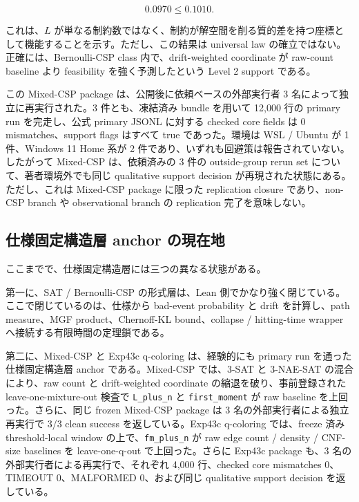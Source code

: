\documentclass[12pt,a4paper]{article}
\begin{document}
\[
0.0970 \le 0.1010.
\]

これは、\(L\) が単なる制約数ではなく、制約が解空間を削る質的差を持つ座標として機能することを示す。ただし、この結果は universal law の確立ではない。正確には、Bernoulli-CSP class 内で、drift-weighted coordinate が raw-count baseline より feasibility を強く予測したという Level 2 support である。

この Mixed-CSP package は、公開後に依頼ベースの外部実行者 3 名によって独立に再実行された。3 件とも、凍結済み bundle を用いて 12,000 行の primary run を完走し、公式 primary JSONL に対する checked core fields は 0 mismatches、support flags はすべて true であった。環境は WSL / Ubuntu が 1 件、Windows 11 Home 系が 2 件であり、いずれも回避策は報告されていない。したがって Mixed-CSP は、依頼済みの 3 件の outside-group rerun set について、著者環境外でも同じ qualitative support decision が再現された状態にある。ただし、これは Mixed-CSP package に限った replication closure であり、non-CSP branch や observational branch の replication 完了を意味しない。

\subsection{仕様固定構造層 anchor の現在地}\label{ux4ed5ux69d8ux56faux5b9aux69cbux9020ux5c64-anchor-ux306eux73feux5728ux5730}

ここまでで、仕様固定構造層には三つの異なる状態がある。

第一に、SAT / Bernoulli-CSP の形式層は、Lean 側でかなり強く閉じている。ここで閉じているのは、仕様から bad-event probability と drift を計算し、path measure、MGF product、Chernoff-KL bound、collapse / hitting-time wrapper へ接続する有限時間の定理鎖である。

第二に、Mixed-CSP と Exp43c q-coloring は、経験的にも primary run を通った 仕様固定構造層 anchor である。Mixed-CSP では、3-SAT と 3-NAE-SAT の混合により、raw count と drift-weighted coordinate の縮退を破り、事前登録された leave-one-mixture-out 検査で \texttt{L\_plus\_n} と \texttt{first\_moment} が raw baseline を上回った。さらに、同じ frozen Mixed-CSP package は 3 名の外部実行者による独立再実行で 3/3 clean success を返している。Exp43c q-coloring では、freeze 済み threshold-local window の上で、\texttt{fm\_plus\_n} が raw edge count / density / CNF-size baselines を leave-one-q-out で上回った。さらに Exp43c package も、3 名の外部実行者による再実行で、それぞれ 4,000 行、checked core mismatches 0、TIMEOUT 0、MALFORMED 0、および同じ qualitative support decision を返している。
\end{document}
